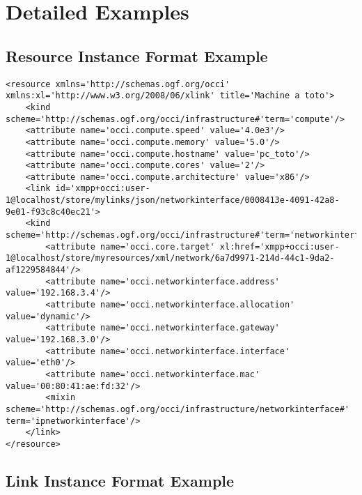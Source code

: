 \documentclass[10pt,a4paper]{article}
\begin{document}


\section{Detailed Examples}
\label{sec:examples}


\subsection{Resource Instance Format Example}
\label{sec:example_resource}

\begin{lstlisting}
<resource xmlns='http://schemas.ogf.org/occi' xmlns:xl='http://www.w3.org/2008/06/xlink' title='Machine a toto'>
	<kind scheme='http://schemas.ogf.org/occi/infrastructure#'term='compute'/>
	<attribute name='occi.compute.speed' value='4.0e3'/>
	<attribute name='occi.compute.memory' value='5.0'/>
	<attribute name='occi.compute.hostname' value='pc_toto'/>
	<attribute name='occi.compute.cores' value='2'/>
	<attribute name='occi.compute.architecture' value='x86'/>
	<link id='xmpp+occi:user-1@localhost/store/mylinks/json/networkinterface/0008413e-4091-42a8-9e01-f93c8c40ec21'>
	<kind scheme='http://schemas.ogf.org/occi/infrastructure#'term='networkinterface'/>
		<attribute name='occi.core.target' xl:href='xmpp+occi:user-1@localhost/store/myresources/xml/network/6a7d9971-214d-44c1-9da2-af1229584844'/>
		<attribute name='occi.networkinterface.address' value='192.168.3.4'/>
		<attribute name='occi.networkinterface.allocation' value='dynamic'/>
		<attribute name='occi.networkinterface.gateway' value='192.168.3.0'/>
		<attribute name='occi.networkinterface.interface' value='eth0'/>
		<attribute name='occi.networkinterface.mac' value='00:80:41:ae:fd:32'/>
		<mixin scheme='http://schemas.ogf.org/occi/infrastructure/networkinterface#' term='ipnetworkinterface'/>
	</link>
</resource>
\end{lstlisting}

\subsection{Link Instance Format Example}
\label{sec:example_link}
\end{document}
